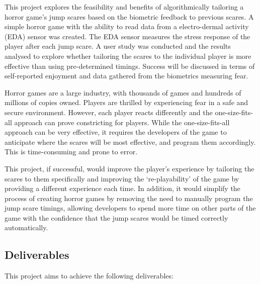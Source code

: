 \documentclass[12pt,a4paper]{article}\usepackage[]{graphicx}\usepackage[]{color}
\begin{document}
This project explores the feasibility and benefits of algorithmically tailoring a horror game's jump scares based on the biometric feedback to previous scares.
A simple horror game with the ability to read data from a electro-dermal activity (EDA) sensor was created.
The EDA sensor measures the stress response of the player after each jump scare.
A user study was conducted and the results analysed to explore whether tailoring the scares to the individual player is more effective than using pre-determined timings.
Success will be discussed in terms of self-reported enjoyment and data gathered from the biometrics measuring fear.

Horror games are a large industry, with thousands of games and hundreds of millions of copies owned.
Players are thrilled by experiencing fear in a safe and secure environment.
However, each player reacts differently and the one-size-fits-all approach can prove constricting for players.
While the one-size-fits-all approach can be very effective, it requires the developers of the game to anticipate where the scares will be most effective, and program them accordingly.
This is time-consuming and prone to error.

This project, if successful, would improve the player's experience by tailoring the scares to them specifically and improving the `re-playability' of the game by providing a different experience each time.
In addition, it would simplify the process of creating horror games by removing the need to manually program the jump scare timings, allowing developers to spend more time on other parts of the game with the confidence that the jump scares would be timed correctly automatically.

\subsection{Deliverables}

This project aims to achieve the following deliverables:
\end{document}

